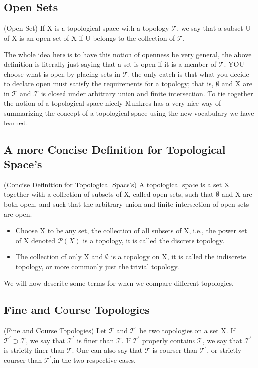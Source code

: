 \documentclass{article}
\newcommand{\topo}{\mathcal T}
\begin{document}
\subsection{Open Sets} 
\begin{myDef*}{(Open Set)}
    If X is a topological space with a topology $\topo$, we
	say that a subset U of X is an open set of X if U belongs to the 
	collection of $\topo$.
\end{myDef*}
The whole idea here is to have this notion of openness be very general,
the above definition is literally just saying that a set is open if 
it is a member of $\topo$. YOU choose what is open by placing sets in
$\topo$, the only catch is that what you decide to declare open must 
satisfy the requirements for a topology; that is, $\emptyset$ and X are 
in $\topo$ and $\topo$ is closed under arbitrary union and finite 
intersection. To tie together the notion of a topological space nicely 
Munkres has a very nice way of summarizing the concept of a topological
space using the new vocabulary we have learned.

\subsection{A more Concise Definition for Topological Space's} 
\begin{myDef*}{(Concise Definition for Topological Space's)}
    A topological space is a set X together with a collection of subsets
    of X, called open sets, such that $\emptyset$ and X are both open, and
    such that the arbitrary union and finite intersection of open sets are open.
\end{myDef*}

\begin{myExa*}{}
    \begin{itemize}
        \item Choose X to be any set, the collection of all subsets of X, i.e., the power set of X denoted 
              $\mathcal{P} (X)$ is a topology, it is called the discrete topology.\\
        \item The collection of only X and $\emptyset$ is a topology on X, it is called the indiscrete topology,
              or more commonly just the trivial topology.
    \end{itemize}
\end{myExa*}
\noindent
We will now describe some terms for when we compare different topologies.
\subsection{Fine and Course Topologies} 
\begin{myDef*}{(Fine and Course Topologies)}
    Let $\topo$ and $\topo^{'}$ be two topologies on a set X. If $\topo^{'} \supset \topo$, we say that $\topo^{'}$ is 
    finer than $\topo$. If $\topo^{'}$ properly contains $\topo$, we say that $\topo^{'}$ is strictly finer than $\topo$.
    One can also say that $\topo$ is courser than $\topo^{'}$, or strictly courser than $\topo^{'}$,in the two respective
    cases.
\end{myDef*}
\end{document}

